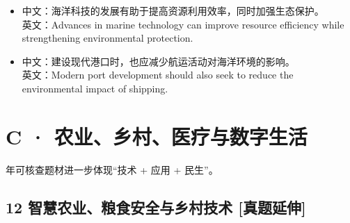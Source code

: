 \documentclass[a4paper,11pt,UTF8,fontset=none]{ctexart}
\begin{document}
\begin{itemize}[leftmargin=1.7em,itemsep=1pt,parsep=0pt,topsep=2pt]
\item \noindent 中文：海洋科技的发展有助于提高资源利用效率，同时加强生态保护。\\ 英文：Advances in marine technology can improve resource efficiency while strengthening environmental protection.\par


\item \noindent 中文：建设现代港口时，也应减少航运活动对海洋环境的影响。\\ 英文：Modern port development should also seek to reduce the environmental impact of shipping.\par


\end{itemize}

\section{C · 农业、乡村、医疗与数字生活}

 年可核查题材进一步体现“技术 + 应用 + 民生”。\par

\subsection{12 智慧农业、粮食安全与乡村技术 {\color{AccentBlue} [真题延伸]}}
\end{document}
